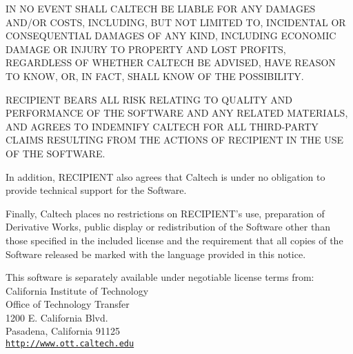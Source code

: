IN NO EVENT SHALL CALTECH BE LIABLE FOR ANY DAMAGES AND/OR COSTS,
INCLUDING, BUT NOT LIMITED TO, INCIDENTAL OR CONSEQUENTIAL DAMAGES OF
ANY KIND, INCLUDING ECONOMIC DAMAGE OR INJURY TO PROPERTY AND LOST
PROFITS, REGARDLESS OF WHETHER CALTECH BE ADVISED, HAVE REASON TO KNOW,
OR, IN FACT, SHALL KNOW OF THE POSSIBILITY.

RECIPIENT BEARS ALL RISK RELATING TO QUALITY AND PERFORMANCE OF THE
SOFTWARE AND ANY RELATED MATERIALS, AND AGREES TO INDEMNIFY CALTECH FOR
ALL THIRD-PARTY CLAIMS RESULTING FROM THE ACTIONS OF RECIPIENT IN THE
USE OF THE SOFTWARE.

In addition, RECIPIENT also agrees that Caltech is under no obligation
to provide technical support for the Software.

Finally, Caltech places no restrictions on RECIPIENT's use, preparation
of Derivative Works, public display or redistribution of the Software
other than those specified in the included license and the requirement
that all copies of the Software released be marked with the language
provided in this notice.

This software is separately available under negotiable license terms
from:\\
California Institute of Technology\\
Office of Technology Transfer\\
1200 E. California Blvd.\\
Pasadena, California 91125\\
\href{http://www.ott.caltech.edu}{\tt http://www.ott.caltech.edu}\\


